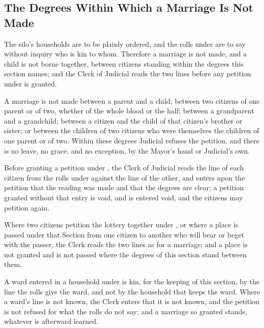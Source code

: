 \begin{setclose}
\section{The Degrees Within Which a Marriage Is Not Made}
\label{sec:marriage:degrees-within-which-a-marriage-is-not-made}

The silo's households are to be plainly ordered, and the rolls under  are to say without inquiry who is kin to whom. Therefore a marriage is not made, and a child is not borne together, between citizens standing within the degrees this section names; and the Clerk of Judicial reads the two lines before any petition under  is granted.

\begin{clauses}
\item A marriage is not made between a parent and a child; between two citizens of one parent or of two, whether of the whole blood or the half; between a grandparent and a grandchild; between a citizen and the child of that citizen's brother or sister; or between the children of two citizens who were themselves the children of one parent or of two. Within these degrees Judicial refuses the petition, and there is no leave, no grace, and no exception, by the Mayor's hand or Judicial's own.
\item Before granting a petition under , the Clerk of Judicial reads the line of each citizen from the rolls under  against the line of the other, and enters upon the petition that the reading was made and that the degrees are clear; a petition granted without that entry is void, and is entered void, and the citizens may petition again.
\item Where two citizens petition the lottery together under , or where a place is passed under that Section from one citizen to another who will bear or beget with the passer, the Clerk reads the two lines as for a marriage; and a place is not granted and is not passed where the degrees of this section stand between them.
\item A ward entered in a household under  is kin, for the keeping of this section, by the line the rolls give the ward, and not by the household that keeps the ward. Where a ward's line is not known, the Clerk enters that it is not known, and the petition is not refused for what the rolls do not say; and a marriage so granted stands, whatever is afterward learned.

\end{clauses}
\end{setclose}
